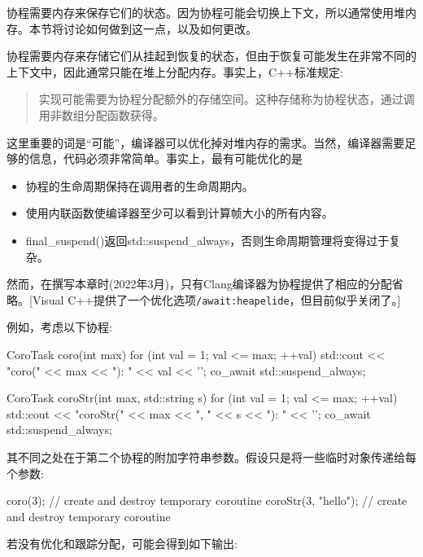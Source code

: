 

协程需要内存来保存它们的状态。因为协程可能会切换上下文，所以通常使用堆内存。本节将讨论如何做到这一点，以及如何更改。



协程需要内存来存储它们从挂起到恢复的状态，但由于恢复可能发生在非常不同的上下文中，因此通常只能在堆上分配内存。事实上，C++标准规定:

\begin{quote}
实现可能需要为协程分配额外的存储空间。这种存储称为协程状态，通过调用非数组分配函数获得。
\end{quote}

这里重要的词是“可能”，编译器可以优化掉对堆内存的需求。当然，编译器需要足够的信息，代码必须非常简单。事实上，最有可能优化的是

\begin{itemize}
\item 
协程的生命周期保持在调用者的生命周期内。

\item 
使用内联函数使编译器至少可以看到计算帧大小的所有内容。

\item 
final\_suspend()返回std::suspend\_always{}，否则生命周期管理将变得过于复杂。
\end{itemize}

然而，在撰写本章时(2022年3月)，只有Clang编译器为协程提供了相应的分配省略。[Visual C++提供了一个优化选项\texttt{/await:heapelide}，但目前似乎关闭了。]

例如，考虑以下协程:

\begin{cpp}
CoroTask coro(int max)
{
	for (int val = 1; val <= max; ++val) {
		std::cout << "coro(" << max << "): " << val << '\n';
		co_await std::suspend_always{};
	}
}

CoroTask coroStr(int max, std::string s)
{
	for (int val = 1; val <= max; ++val) {
		std::cout << "coroStr(" << max << ", " << s << "): " << '\n';
		co_await std::suspend_always{};
	}
}
\end{cpp}

其不同之处在于第二个协程的附加字符串参数。假设只是将一些临时对象传递给每个参数:

\begin{cpp}
coro(3); // create and destroy temporary coroutine
coroStr(3, "hello"); // create and destroy temporary coroutine
\end{cpp}

若没有优化和跟踪分配，可能会得到如下输出:

